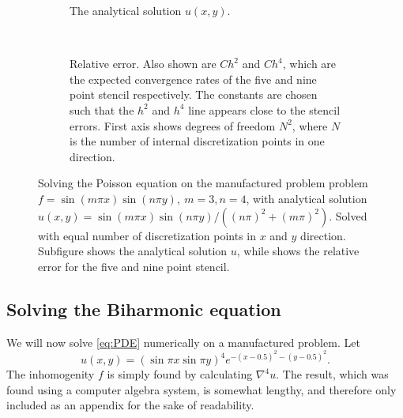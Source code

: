 \begin{figure}[tb]
  \centering
  \begin{subfigure}[t]{0.49\textwidth}
    \caption{The analytical solution $u(x, y)$.}
    \label{fig:pde:order_solution}
  \end{subfigure}
  ~
  \begin{subfigure}[t]{0.49\textwidth}

    \centering 
    \caption{Relative error.
      Also shown are $Ch^2$ and $Ch^4$, which are the expected convergence rates of the five and nine point stencil respectively.
      The constants are chosen such that the $h^2$ and $h^4$ line appears close to the stencil errors.
      First axis shows degrees of freedom $N^2$, where $N$ is the number of internal discretization points in one direction.
    }
    \label{fig:pde:order}
  \end{subfigure}
  \caption{Solving the Poisson equation on the manufactured problem problem $f=\sin(m \pi x)\sin(n\pi y), ~m = 3, n=4$, with analytical solution $u(x, y) = \sin(m \pi x)\sin(n \pi y) / ((n\pi)^2 + (m\pi)^2)$.
    Solved with equal number of discretization points in $x$ and $y$ direction.
    Subfigure  shows the analytical solution $u$, while  shows the relative error for the five and nine point stencil.
  }
\end{figure}


\subsection{Solving the Biharmonic equation}
\label{sec:pde:solving}
We will now solve \eqref{eq:PDE} numerically on a manufactured problem.
Let
$$
u(x, y) =
\left(
\sin \pi x
\sin \pi y
\right)^4
e^{-(x-0.5)^2 - (y-0.5)^2}.
$$
The inhomogenity $f$ is simply found by calculating $\nabla^4 u$.
The result, which was found using a computer algebra system, is somewhat lengthy, and therefore only included as an appendix for the sake of readability.



